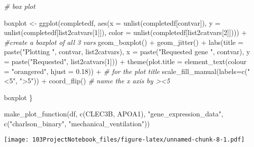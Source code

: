 \documentclass[
]{article}
\newenvironment{Shaded}{\begin{snugshade}}{\end{snugshade}}
\newcommand{\AttributeTok}[1]{\textcolor[rgb]{0.77,0.63,0.00}{#1}}
\newcommand{\CommentTok}[1]{\textcolor[rgb]{0.56,0.35,0.01}{\textit{#1}}}
\newcommand{\DecValTok}[1]{\textcolor[rgb]{0.00,0.00,0.81}{#1}}
\newcommand{\FloatTok}[1]{\textcolor[rgb]{0.00,0.00,0.81}{#1}}
\newcommand{\FunctionTok}[1]{\textcolor[rgb]{0.00,0.00,0.00}{#1}}
\newcommand{\NormalTok}[1]{#1}
\newcommand{\OtherTok}[1]{\textcolor[rgb]{0.56,0.35,0.01}{#1}}
\newcommand{\SpecialCharTok}[1]{\textcolor[rgb]{0.00,0.00,0.00}{#1}}
\newcommand{\StringTok}[1]{\textcolor[rgb]{0.31,0.60,0.02}{#1}}
\begin{document}
\begin{Shaded}
\begin{Highlighting}[]
  \CommentTok{\# box plot}
  
\NormalTok{  boxplot }\OtherTok{\textless{}{-}} \FunctionTok{ggplot}\NormalTok{(completedf, }\FunctionTok{aes}\NormalTok{(}\AttributeTok{x =} \FunctionTok{unlist}\NormalTok{(completedf[contvar]), }\AttributeTok{y =} \FunctionTok{unlist}\NormalTok{(completedf[list2catvars[}\DecValTok{1}\NormalTok{]]), }\AttributeTok{color =} \FunctionTok{unlist}\NormalTok{(completedf[list2catvars[}\DecValTok{2}\NormalTok{]]))) }\SpecialCharTok{+} \CommentTok{\#create a boxplot of all 3 vars}
    \FunctionTok{geom\_boxplot}\NormalTok{() }\SpecialCharTok{+}
    \FunctionTok{geom\_jitter}\NormalTok{() }\SpecialCharTok{+}
    \FunctionTok{labs}\NormalTok{(}\AttributeTok{title =} \FunctionTok{paste}\NormalTok{(}\StringTok{"Plotting "}\NormalTok{, contvar, list2catvars), }\AttributeTok{x =} \FunctionTok{paste}\NormalTok{(}\StringTok{"Requested gene "}\NormalTok{, contvar), }\AttributeTok{y =} \FunctionTok{paste}\NormalTok{(}\StringTok{"Requested"}\NormalTok{, list2catvars[}\DecValTok{1}\NormalTok{])) }\SpecialCharTok{+} 
    \FunctionTok{theme}\NormalTok{(}\AttributeTok{plot.title =} \FunctionTok{element\_text}\NormalTok{(}\AttributeTok{colour =} \StringTok{"orangered"}\NormalTok{, }\AttributeTok{hjust =} \FloatTok{0.18}\NormalTok{)) }\SpecialCharTok{+} \CommentTok{\# for the plot title}
    \FunctionTok{scale\_fill\_manual}\NormalTok{(}\AttributeTok{labels=}\FunctionTok{c}\NormalTok{(}\StringTok{"\textless{}5"}\NormalTok{, }\StringTok{"\textgreater{}5"}\NormalTok{)) }\SpecialCharTok{+}
    \FunctionTok{coord\_flip}\NormalTok{() }\CommentTok{\# name the x axis by \textgreater{}\textless{}5}
  
\NormalTok{  boxplot}
\NormalTok{\}}
\end{Highlighting}
\end{Shaded}

\begin{Shaded}
\begin{Highlighting}[]
\FunctionTok{make\_plot\_function}\NormalTok{(df, }\FunctionTok{c}\NormalTok{(}\StringTok{\textquotesingle{}CLEC3B\textquotesingle{}}\NormalTok{, }\StringTok{\textquotesingle{}APOA1\textquotesingle{}}\NormalTok{), }\StringTok{"gene\_expression\_data"}\NormalTok{, }\FunctionTok{c}\NormalTok{(}\StringTok{"charlson\_binary"}\NormalTok{, }\StringTok{"mechanical\_ventilation"}\NormalTok{))}
\end{Highlighting}
\end{Shaded}

\texttt{[image: 103ProjectNotebook\_files/figure-latex/unnamed-chunk-8-1.pdf]}
\end{document}
